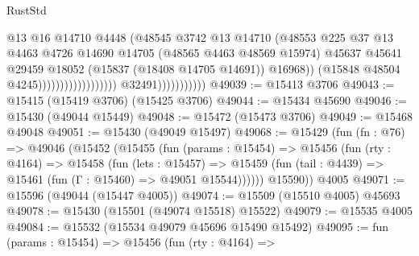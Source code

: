 \begin{lexlean}{RustStd}
\begin{coremodule}
                                                            @13
                                                            @16
                                                            @14710
                                                            @4448
                                                            (@48545
                                                              @3742
                                                              @13
                                                              @14710
                                                              (@48553
                                                                @225
                                                                @37
                                                                @13
                                                                @4463
                                                                @4726
                                                                @14690
                                                                @14705
                                                                (@48565 @4463 @48569 @15974)
                                                                @45637
                                                                @45641
                                                                @29459
                                                                @18052
                                                                (@15837 (@18408 @14705 @14691))
                                                                @16968))
                                                            (@15848 @48504 @4245))))))))))))))))))
                          @32491)))))))))))
@49039 := @15413 @3706
@49043 := @15415 (@15419 @3706) (@15425 @3706)
@49044 := @15434 @45690
@49046 := @15430 (@49044 @15449)
@49048 := @15472 (@15473 @3706)
@49049 := @15468 @49048
@49051 := @15430 (@49049 @15497)
@49068 := @15429
    (fun (fn : @76) =>
    @49046
      (@15452
        (@15455
          (fun (params : @15454) =>
          @15456
            (fun (rty : @4164) =>
            @15458
              (fun (lets : @15457) =>
              @15459 (fun (tail : @4439) => @15461 (fun (Γ : @15460) => @49051 @15544))))))
        @15590))
    @4005
@49071 := @15596 (@49044 (@15447 @4005))
@49074 := @15509 (@15510 @4005) @45693
@49078 := @15430 (@15501 (@49074 @15518) @15522)
@49079 := @15535 @4005
@49084 := @15532 (@15534 @49079 @45696 @15490 @15492)
@49095 := fun (params : @15454) =>
  @15456
    (fun (rty : @4164) =>

\end{coremodule}
\end{lexlean}
